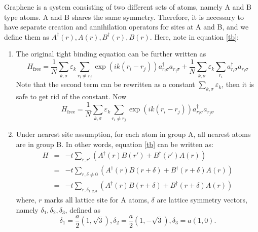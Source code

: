 \documentclass{article}
\begin{document}
Graphene is a system consisting of two different sets of atoms, namely A and B type atoms. A and B shares the same symmetry. Therefore, it is necessary to have separate creation and annihilation operators for sites at A and B, and we define them as $A^{\dag}(r),A(r),B^{\dag}(r), B(r)$. Here, note in equation \ref{tb}:
\begin{enumerate}
    \item The original tight binding equation can be further written as
    \begin{equation}
    H_{\text{free}} 
    =\dfrac{1}{N} \underset{k, \sigma}{\sum} 
    \varepsilon_k \underset{r_i\neq r_j}{\sum}\exp{(ik(r_i-r_j))} a^{\dag}_{r_i\sigma}a_{r_j\sigma} +
    \dfrac{1}{N} \underset{k, \sigma}{\sum} 
    \varepsilon_k \underset{r_i}{\sum} a^{\dag}_{r_i\sigma}a_{r_i\sigma}
    \end{equation}
    Note that the second term can be rewritten as a constant $ \underset{k, \sigma}{\sum} 
    \varepsilon_k$, then it is safe to get rid of the constant. Now
    \begin{equation}
    H_{\text{free}}  = 
        \dfrac{1}{N} \underset{k, \sigma}{\sum} 
    \varepsilon_k \underset{r_i\neq r_j}{\sum}\exp{(ik(r_i-r_j))} a^{\dag}_{r_i\sigma}a_{r_j\sigma}
    \end{equation}
    \item Under nearest site assumption, for each atom in group A, all nearest atoms are in group B. In other words, equation \ref{tb} can be written as:
    \begin{eqnarray*}  H & = & - t \underset{r, r'}{\sum} (A^{\dag} (r) B (r') + B^{\dag} (r') A  (r))\\  & = & - t \underset{r, \delta\neq0}{\sum} (A^{\dag} (r) B (r + \delta) +  B^{\dag} (r+\delta) A (r )) 
    \\  & = & - t \underset{r, \delta_{1,2,3}}{\sum} (A^{\dag} (r) B (r + \delta) +  B^{\dag} (r+\delta) A (r)) 
    \end{eqnarray*}
    where, $r$ marks all lattice site for A atoms, $\delta$ are lattice symmetry vectors, namely $\delta_1,\delta_2,\delta_3$, defined as
    \begin{equation}
        \delta_1 = \dfrac{a}{2}(1,\sqrt{3}), \delta_2 = \dfrac{a}{2}(1,-\sqrt{3}),\delta_3 = a(1,0).
    \end{equation}
\end{enumerate}
\end{document}
